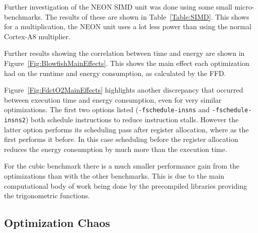 \documentclass[twocolumn]{article}
\begin{document}
Further investigation of the NEON SIMD unit was done using some small micro-benchmarks. The results of these are shown in Table~\ref{Table:SIMD}.
This shows for a multiplication, the NEON unit uses a lot less power than using the normal Cortex-A8 multiplier.



Further results showing the correlation between time and energy are shown in Figure~\ref{Fig:BlowfishMainEffects}. This shows the main effect each optimization had on the runtime and energy consumption, as calculated by the FFD.



Figure~\ref{Fig:FdctO2MainEffects} highlights another discrepancy that occurred between execution time and energy consumption, even for very similar optimizations. The first two options listed (\texttt{-fschedule-insns} and \texttt{-fschedule-insns2}) both schedule instructions to reduce instruction stalls. However the latter option performs its scheduling pass after register allocation, where as the first performs it before. In this case scheduling before the register allocation reduces the energy consumption by much more than the execution time.

For the cubic benchmark there is a much smaller performance gain from the optimizations than with the other benchmarks. This is due to the main computational body of work being done by the precompiled libraries providing the trigonometric functions.

\subsection{Optimization Chaos}
\end{document}

